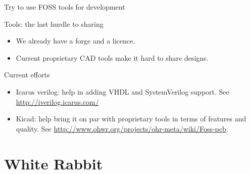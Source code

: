 \documentclass[compress,red]{beamer}
\begin{document}
\begin{frame}{Try to use FOSS tools for development}

\begin{block}{Tools: the last hurdle to sharing}
\begin{itemize}
 \item We already have a forge and a licence.
 \item Current proprietary CAD tools make it hard to share designs.
\end{itemize}
\end{block}

\begin{block}{Current efforts}
\begin{itemize}
 \item Icarus verilog: help in adding VHDL and SystemVerilog support.
 See \href{http://iverilog.icarus.com/}{http://iverilog.icarus.com/}
 \item Kicad: help bring it on par with proprietary tools in terms of
   features and quality. See \href{http://www.ohwr.org/projects/ohr-meta/wiki/Foss-pcb}{http://www.ohwr.org/projects/ohr-meta/wiki/Foss-pcb}.
\end{itemize}
\end{block}

\end{frame}

\section {White Rabbit}


\end{document}
